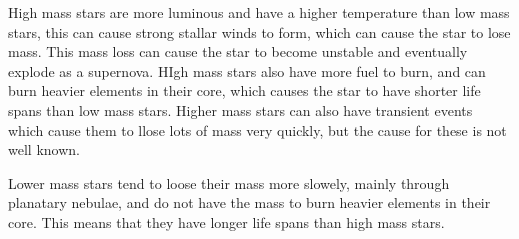 \documentclass{tufte-handout}
\begin{document}
\begin{question}
\qsubpart

High mass stars are more luminous and have a higher temperature than low mass stars, this can cause strong stallar
winds to form, which can cause the star to lose mass. This mass loss can cause the star to become unstable and
eventually explode as a supernova.
HIgh mass stars also have more fuel to burn, and can burn heavier elements in their core, which causes the star to
have shorter life spans than low mass stars.
Higher mass stars can also have transient events which cause them to llose lots of mass very quickly,
but the cause for these is not well known. 

Lower mass stars tend to loose their mass more slowely, mainly through planatary nebulae, and do not have the
mass to burn heavier elements in their core. This means that they have longer life spans than high mass stars.
\end{question}

\clearpage
\end{document}
